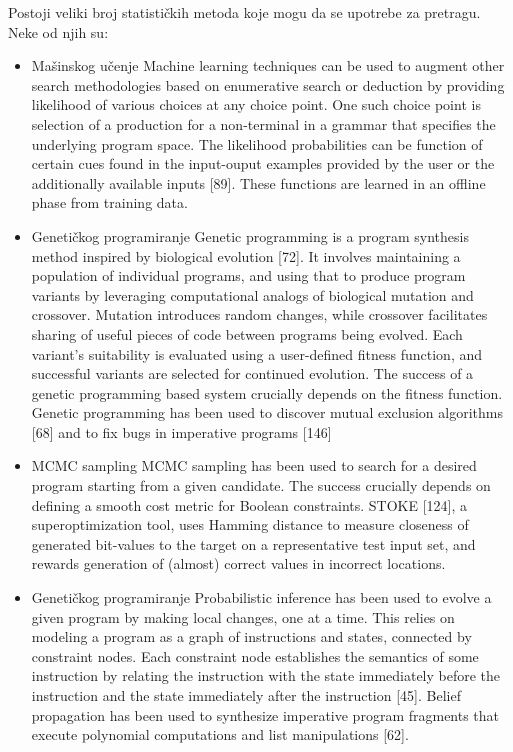 Postoji veliki broj statističkih metoda koje mogu da se upotrebe za pretragu. Neke od njih su:
\begin{itemize}
  \item Mašinskog učenje
  Machine learning techniques can be used to augment other search
methodologies based on enumerative search or deduction by providing
likelihood of various choices at any choice point. One such choice point
is selection of a production for a non-terminal in a grammar that
specifies the underlying program space. The likelihood probabilities can
be function of certain cues found in the input-ouput examples provided
by the user or the additionally available inputs [89]. These functions
are learned in an offline phase from training data.

  
  \item Genetičkog programiranje
  Genetic programming is a program synthesis method inspired by
biological evolution [72]. It involves maintaining a population of individual
programs, and using that to produce program variants by
leveraging computational analogs of biological mutation and crossover.
Mutation introduces random changes, while crossover facilitates sharing
of useful pieces of code between programs being evolved. Each variant’s
suitability is evaluated using a user-defined fitness function, and
successful variants are selected for continued evolution. The success
of a genetic programming based system crucially depends on the fitness
function. Genetic programming has been used to discover mutual
exclusion algorithms [68] and to fix bugs in imperative programs [146]


  \item MCMC sampling
  MCMC sampling has been used to search for a desired program
starting from a given candidate. The success crucially depends on
defining a smooth cost metric for Boolean constraints. STOKE [124], a
superoptimization tool, uses Hamming distance to measure closeness
of generated bit-values to the target on a representative test input set,
and rewards generation of (almost) correct values in incorrect locations.


  \item Genetičkog programiranje
Probabilistic inference has been used to evolve a given program by
making local changes, one at a time. This relies on modeling a program
as a graph of instructions and states, connected by constraint nodes.
Each constraint node establishes the semantics of some instruction by
relating the instruction with the state immediately before the instruction
and the state immediately after the instruction [45]. Belief propagation
has been used to synthesize imperative program fragments that execute
polynomial computations and list manipulations [62].

\end{itemize}

